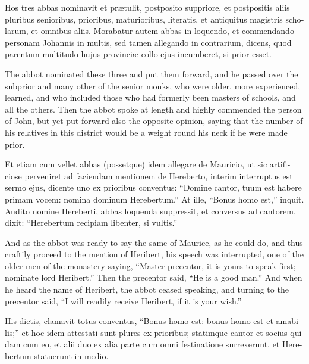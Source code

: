 \documentclass{book}
\begin{document}
\begin{paracol}{2}
\switchcolumn*

\begin{otherlanguage}{latin}
Hos tres abbas nominavit et pr\ae{}tulit, postposito suppriore, et postpositis aliis pluribus senioribus, prioribus, maturioribus, literatis, et antiquitus magistris scholarum, et omnibus aliis. Morabatur autem abbas in loquendo, et commendando personam Johannis in multis, sed tamen allegando in contrarium, dicens, quod parentum multitudo hujus provinci\ae{} collo ejus incumberet, si prior esset. 
\end{otherlanguage}

\switchcolumn

The abbot nominated these three and put them forward, and he passed over the subprior and many other of the senior monks, who were older, more experienced, learned, and who included those who had formerly been masters of schools, and all the others. Then the abbot spoke at length and highly commended the person of John, but yet put forward also the opposite opinion, saying that the number of his relatives in this district would be a weight round his neck if he were made prior.

\switchcolumn*

\begin{otherlanguage}{latin}
Et etiam cum vellet abbas (possetque) idem allegare de Mauricio, ut sic artificiose perveniret ad faciendam mentionem de Hereberto, interim interruptus est sermo ejus, dicente uno ex prioribus conventus: ``Domine cantor, tuum est habere primam vocem: nomina dominum Herebertum.'' At ille, ``Bonus homo est,'' inquit. Audito nomine Hereberti, abbas loquenda suppressit, et conversus ad cantorem, dixit: ``Herebertum recipiam libenter, si vultis.''
\end{otherlanguage}

\switchcolumn

And as the abbot was ready to say the same of Maurice, as he could do, and thus craftily proceed to the mention of Heribert, his speech was interrupted, one of the older men of the monastery saying, ``Master precentor, it is yours to speak first; nominate lord Heribert.'' Then the precentor said, ``He is a good man.'' And when he heard the name of Heribert, the abbot ceased speaking, and turning to the precentor said, ``I will readily receive Heribert, if it is your wish.''

\switchcolumn*

\begin{otherlanguage}{latin}
His dictis, clamavit totus conventus, ``Bonus homo est: bonus homo est et amabilis;'' et hoc idem attestati sunt plures ex prioribus; statimque cantor et socius quidam cum eo, et alii duo ex alia parte cum omni festinatione surrexerunt, et Herebertum statuerunt in medio.
\end{otherlanguage}


\end{paracol}
\end{document}
